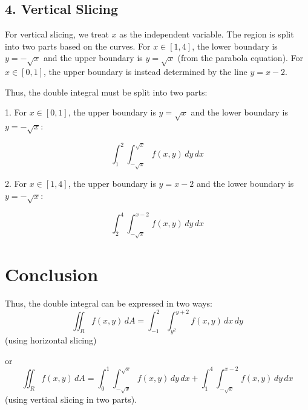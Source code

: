 \documentclass[11pt]{article}
\begin{document}
\newpage

\subsection{4. Vertical Slicing}

For vertical slicing, we treat \( x \) as the independent variable. The region is split into two parts based on the curves. For \( x \in [1, 4] \), the lower boundary is \( y = -\sqrt{x} \) and the upper boundary is \( y = \sqrt{x} \) (from the parabola equation). For \( x \in [0, 1] \), the upper boundary is instead determined by the line \( y = x - 2 \).

Thus, the double integral must be split into two parts:

1. For \( x \in [0, 1] \), the upper boundary is \( y = \sqrt{x} \) and the lower boundary is \( y = -\sqrt{x} \):

\[
\int_1^2 \int_{-\sqrt{x}}^{\sqrt{x}} f(x, y) \, dy \, dx
\]

2. For \( x \in [1, 4] \), the upper boundary is \( y = x - 2 \) and the lower boundary is \( y = -\sqrt{x} \):

\[
\int_2^4 \int_{-\sqrt{x}}^{x-2} f(x, y) \, dy \, dx
\]

\newpage

\section{Conclusion}

Thus, the double integral can be expressed in two ways:
\[
\iint_R f(x, y) \, dA = \int_{-1}^2 \int_{y^2}^{y+2} f(x, y) \, dx \, dy
\]
(using horizontal slicing)

or
\[
\iint_R f(x, y) \, dA = \int_0^1 \int_{-\sqrt{x}}^{\sqrt{x}} f(x, y) \, dy \, dx + \int_1^4 \int_{-\sqrt{x}}^{x-2} f(x, y) \, dy \, dx
\]
(using vertical slicing in two parts).
\end{document}
